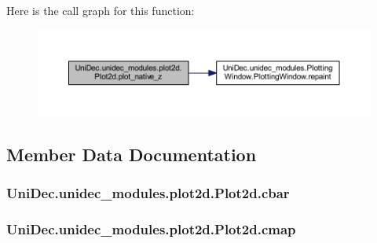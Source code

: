 Here is the call graph for this function\+:\nopagebreak
\begin{figure}[H]
\begin{center}
\leavevmode
\includegraphics[width=350pt]{class_uni_dec_1_1unidec__modules_1_1plot2d_1_1_plot2d_ab7c669724727c37898f82d9fceef408a_cgraph}
\end{center}
\end{figure}




\subsection{Member Data Documentation}
\hypertarget{class_uni_dec_1_1unidec__modules_1_1plot2d_1_1_plot2d_aae30b2754664594456a74e40d9eaebcd}{}
\subsubsection[{cbar}]{\setlength{\rightskip}{0pt plus 5cm}Uni\+Dec.\+unidec\+\_\+modules.\+plot2d.\+Plot2d.\+cbar}\label{class_uni_dec_1_1unidec__modules_1_1plot2d_1_1_plot2d_aae30b2754664594456a74e40d9eaebcd}
\hypertarget{class_uni_dec_1_1unidec__modules_1_1plot2d_1_1_plot2d_ada1d29662069c476cc7a9f02cdfc8bc8}{}
\subsubsection[{cmap}]{\setlength{\rightskip}{0pt plus 5cm}Uni\+Dec.\+unidec\+\_\+modules.\+plot2d.\+Plot2d.\+cmap}\label{class_uni_dec_1_1unidec__modules_1_1plot2d_1_1_plot2d_ada1d29662069c476cc7a9f02cdfc8bc8}
\hypertarget{class_uni_dec_1_1unidec__modules_1_1plot2d_1_1_plot2d_ac9b0a8d19a535c37ee986b0dbd8705b3}{}
